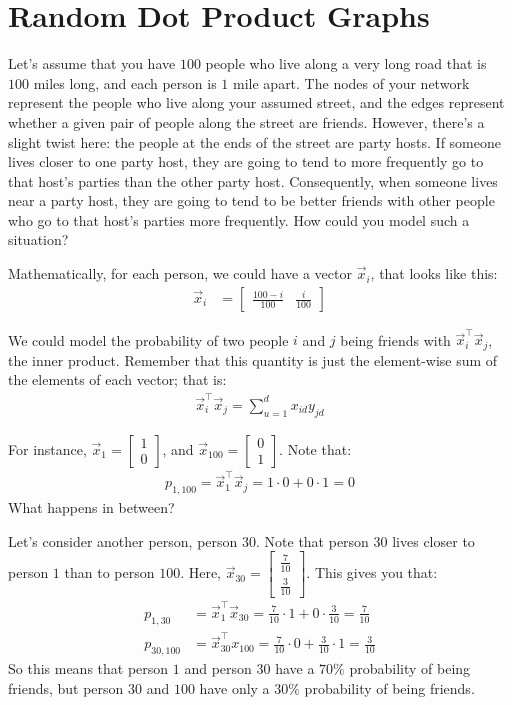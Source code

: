 \section{Random Dot Product Graphs}
\label{sec:ch5:rdpg}

Let's assume that you have $100$ people who live along a very long road that is $100$ miles long, and each person is $1$ mile apart. The nodes of your network represent the people who live along your assumed street, and the edges represent whether a given pair of people along the street are friends. However, there's a slight twist here: the people at the ends of the street are party hosts. If someone lives closer to one party host, they are going to tend to more frequently go to that host's parties than the other party host. Consequently, when someone lives near a party host, they are going to tend to be better friends with other people who go to that host's parties more frequently. How could you model such a situation?

Mathematically, for each person, we could have a vector $\vec x_i$, that looks like this:
\begin{align*}
    \vec x_i &= \begin{bmatrix}
        \frac{100 - i}{100} & \frac{i}{100}
    \end{bmatrix}
\end{align*}

We could model the probability of two people $i$ and $j$ being friends with $\vec x_i^\top \vec x_j$, the inner product. Remember that this quantity is just the element-wise sum of the elements of each vector; that is:
\begin{align*}
    \vec x_i^\top \vec x_j = \sum_{u = 1}^d x_{id}y_{jd}
\end{align*}

For instance, $\vec x_1 = \begin{bmatrix}1 \\ 0\end{bmatrix}$, and $\vec x_{100} = \begin{bmatrix} 0 \\ 1\end{bmatrix}$. Note that:
\begin{align*}
p_{1,100} = \vec x_1^\top \vec x_j = 1 \cdot 0 + 0 \cdot 1 = 0
\end{align*}
What happens in between?

Let's consider another person, person $30$. Note that person $30$ lives closer to person $1$ than to person $100$.  Here, $\vec x_{30} = \begin{bmatrix} \frac{7}{10}\\ \frac{3}{10}\end{bmatrix}$. This gives you that:
\begin{align*}
p_{1,30} &= \vec x_1^\top \vec x_{30} = \frac{7}{10}\cdot 1 + 0 \cdot \frac{3}{10} = \frac{7}{10} \\
p_{30, 100} &= \vec x_{30}^\top x_{100} = \frac{7}{10} \cdot 0 + \frac{3}{10} \cdot 1 = \frac{3}{10}
\end{align*}
So this means that person $1$ and person $30$ have a $70\%$ probability of being friends, but person $30$ and $100$ have only a $30\%$ probability of being friends.

